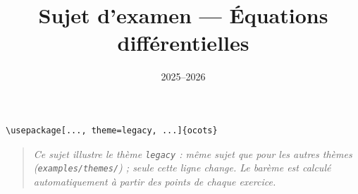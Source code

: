 \documentclass[11pt]{ocots-exam}
\title{Sujet d'examen --- Équations différentielles}
\date{2025--2026}
\begin{document}
\maketitle

\begin{lstlisting}
\usepackage[..., theme=legacy, ...]{ocots}
\end{lstlisting}
\begin{quote}\itshape
Ce sujet illustre le th\`eme \texttt{legacy} : m\^eme sujet que pour les
autres th\`emes (\texttt{examples/themes/}) ; seule cette ligne change.
Le bar\`eme est calcul\'e automatiquement \`a partir des points de chaque
exercice.
\end{quote}

\medskip

\end{document}

